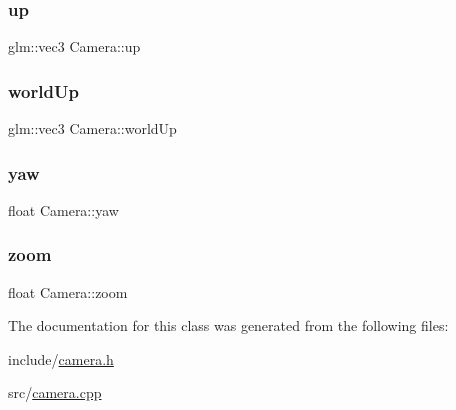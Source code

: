 \mbox{\label{classCamera_a3fe5f351380fb118ffc600591769f049}} 
\subsubsection{\texorpdfstring{up}{up}}
{\footnotesize\ttfamily glm\+::vec3 Camera\+::up}

\mbox{\label{classCamera_a97e7a4ff433ea2bfcbfd40469aaf4d83}} 
\subsubsection{\texorpdfstring{world\+Up}{worldUp}}
{\footnotesize\ttfamily glm\+::vec3 Camera\+::world\+Up}

\mbox{\label{classCamera_ad76701b22630f2df28a0ae15f0497a3a}} 
\subsubsection{\texorpdfstring{yaw}{yaw}}
{\footnotesize\ttfamily float Camera\+::yaw}

\mbox{\label{classCamera_a21fc9e142b104d8e94126657abaa075f}} 
\subsubsection{\texorpdfstring{zoom}{zoom}}
{\footnotesize\ttfamily float Camera\+::zoom}



The documentation for this class was generated from the following files\+:\begin{DoxyCompactItemize}
\item 
include/\hyperlink{camera_8h}{camera.\+h}\item 
src/\hyperlink{camera_8cpp}{camera.\+cpp}\end{DoxyCompactItemize}
